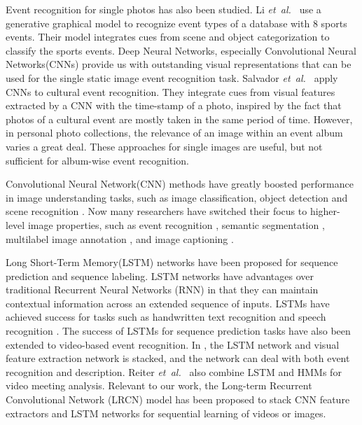 \documentclass[runningheads]{llncs}
\newcommand{\etal}{\mbox{\emph{et al.\ }}}
\begin{document}
Event recognition for single photos has also been studied.  Li \etal \cite{what_where} use a generative graphical model to recognize event types of a database with 8 sports events. Their model integrates cues from scene and object categorization to classify the sports events. Deep Neural Networks, especially  Convolutional Neural Networks(CNNs) provide us with outstanding visual representations that can be used for the single static image event recognition task\cite{Park_2015_CVPR_Workshops, cSalvadora}. Salvador \etal\cite{cSalvadora} apply CNNs to cultural event recognition. They integrate cues from visual features extracted by a CNN with the time-stamp of a photo, inspired by the fact that photos of a cultural event are mostly taken in the same period of time. However, in personal photo collections, the relevance of an image within an event album varies a great deal. These approaches for single images are useful, but not sufficient for album-wise event recognition.
%
%
%
%
%
%

Convolutional Neural Network(CNN) methods have greatly boosted performance in image understanding tasks, such as image classification, object detection and scene recognition \cite{imagenet, googlenet, rcnn, places}. Now many researchers have switched their focus to higher-level image properties, such as event recognition \cite{event_recognition}, semantic segmentation \cite{long_shelhamer_fcn},  multilabel image annotation \cite{tagging}, and image captioning \cite{lrcn}. 

Long Short-Term Memory(LSTM) networks \cite{lstm} have been proposed for sequence prediction and sequence labeling. LSTM networks have advantages over traditional Recurrent Neural Networks (RNN) in that they can maintain contextual information across  an extended sequence of inputs. LSTMs have achieved success for tasks such as handwritten text recognition \cite{Graves} and speech recognition \cite{speech}. 
The success of LSTMs for sequence prediction tasks have also been extended to video-based event recognition. In \cite{lstm}, the LSTM network and visual feature extraction network is stacked, and the network can deal with both event recognition and description. Reiter \etal \cite{lstm2} also combine LSTM and HMMs for video meeting analysis. Relevant to our work, the Long-term Recurrent Convolutional Network (LRCN) model \cite{lrcn} has been proposed to stack CNN feature extractors and LSTM networks for sequential learning of videos or images.
\end{document}

